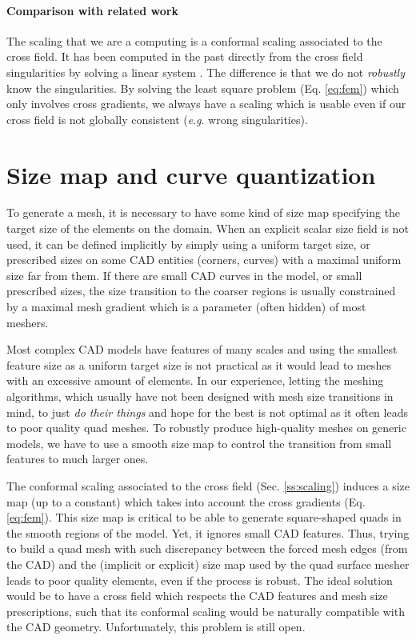\documentclass[AMA,STIX1COL]{WileyNJD-v2}
\newcommand{\eg}{\textit{e}.\textit{g}. }
\newcommand\rsec[1]{Sec. \ref{#1}}
\newcommand\reqt[1]{Eq. \ref{#1}}
\begin{document}
{\paragraph{Comparison with related work} 
The scaling that we are a computing is a conformal scaling
associated to the cross field. It has been computed in the past directly from the
cross field singularities by solving a linear system \cite{bunin2007,ben2008}.
The difference is that we do not \emph{robustly} know the singularities.
By solving the least square problem (\reqt{eq:fem}) which only involves
cross gradients, we always have a scaling 
which is usable even if our cross field is not globally consistent (\eg wrong singularities).

\section{Size map and curve quantization}
\label{sec:sizemap_and_curve}

To generate a mesh, it is necessary to have some kind of size map specifying
the target size of the elements on the domain. When an explicit scalar size
field is not used, it can be defined implicitly by simply using a uniform target
size, or prescribed sizes on some CAD entities (corners, curves) with a maximal
uniform size far from them.  If there are small CAD curves in the model, or
small prescribed sizes, the size transition to the coarser regions is usually
constrained by a maximal mesh gradient which is a parameter (often hidden) of
most meshers.

Most complex CAD models have features of many scales and
using the smallest feature size as a uniform target size is not
practical as it would lead to meshes with an excessive amount of
elements. In our experience, letting the meshing
algorithms, which usually have not been designed with mesh size transitions in
mind, to just \emph{do their things} and hope for the best is not optimal
as it often leads to poor quality quad meshes.  To robustly produce high-quality meshes
on generic models, we have to use a smooth size map to control the transition
from small features to much larger ones.

The conformal scaling associated to the cross field (\rsec{ss:scaling})
induces a size map (up to a constant) which takes into account the
cross gradients (\reqt{eq:fem}). This size map is critical to
be able to generate square-shaped quads in the smooth regions of the
model. Yet, it ignores small CAD features.
Thus, trying to build a quad mesh with such discrepancy between the
forced mesh edges (from the CAD) and the (implicit or explicit) size map used
by the quad surface mesher leads to poor quality elements, even if the process is
robust. The ideal solution would be to have a cross field which respects the
CAD features and mesh size prescriptions, such that its conformal
scaling would be naturally compatible with the CAD geometry. Unfortunately,
this problem is still open.

}
\end{document}
